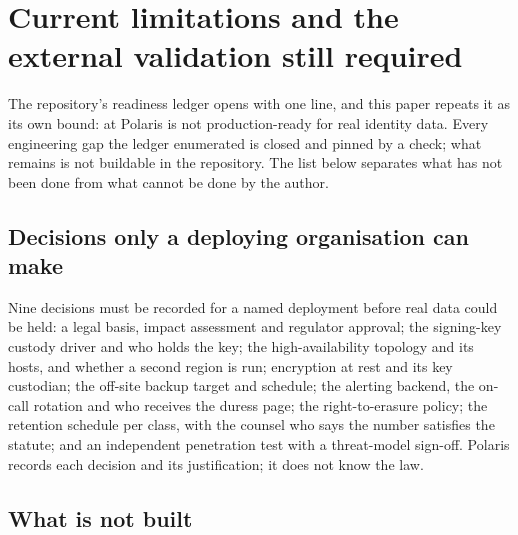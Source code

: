 \section{Current limitations and the external validation still required}
\label{sec:limitations}



The repository's readiness ledger opens with one line, and this paper repeats it as its own bound:
at  Polaris is not production-ready for real identity data. Every engineering gap
the ledger enumerated is closed and pinned by a check; what remains is not buildable in the
repository. The list below separates what has not been done from what cannot be done by the author.

\subsection{Decisions only a deploying organisation can make}

Nine decisions must be recorded for a named deployment before real data could be held: a legal
basis, impact assessment and regulator approval; the signing-key custody driver and who holds the
key; the high-availability topology and its hosts, and whether a second region is run; encryption at
rest and its key custodian; the off-site backup target and schedule; the alerting backend, the
on-call rotation and who receives the duress page; the right-to-erasure policy; the retention
schedule per class, with the counsel who says the number satisfies the statute; and an independent
penetration test with a threat-model sign-off. Polaris records each decision and its justification;
it does not know the law. \sExt

\subsection{What is not built}

